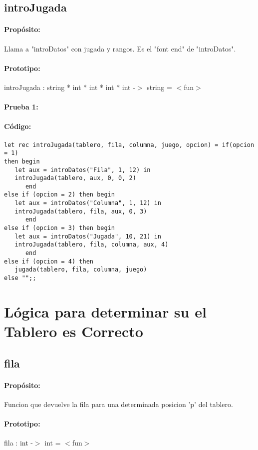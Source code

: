 \subsection{introJugada}

\paragraph{Propósito:} Llama a "introDatos" con jugada y rangos. Es el "font end" de
"introDatos".
\paragraph{Prototipo:} introJugada : string * int * int * int * int -$>$ string = $<$fun$>$
\paragraph{Prueba 1:}
\paragraph{Código:}
\begin{verbatim}
let rec introJugada(tablero, fila, columna, juego, opcion) = if(opcion = 1)
then begin
   let aux = introDatos("Fila", 1, 12) in 
   introJugada(tablero, aux, 0, 0, 2)
      end
else if (opcion = 2) then begin
   let aux = introDatos("Columna", 1, 12) in 
   introJugada(tablero, fila, aux, 0, 3)
      end
else if (opcion = 3) then begin
   let aux = introDatos("Jugada", 10, 21) in 
   introJugada(tablero, fila, columna, aux, 4)
      end
else if (opcion = 4) then
   jugada(tablero, fila, columna, juego)
else "";;
\end{verbatim}

\section{Lógica para determinar su el Tablero es Correcto}

\subsection{fila}

\paragraph{Propósito:} Funcion que devuelve la fila para una determinada posicion 'p' del
tablero.
\paragraph{Prototipo:} fila : int -$>$ int = $<$fun$>$
